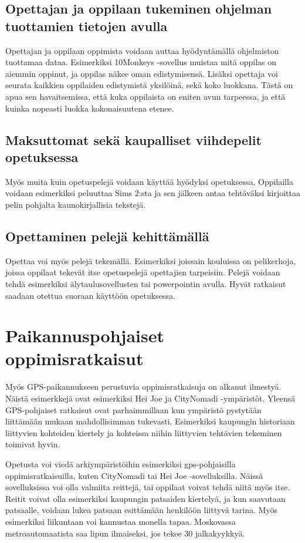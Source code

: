 \documentclass[utf8,bachelor]{gradu3}
\begin{document}
\subsection{Opettajan ja oppilaan tukeminen ohjelman tuottamien tietojen avulla}
Opettajan ja oppilaan oppimista voidaan auttaa hyödyntämällä ohjelmiston tuottamaa dataa. Esimerkiksi 10Monkeys -sovellus muistaa mitä oppilas on aiemmin oppinut, ja oppilas näkee oman edistymisensä. Lisäksi opettaja voi seurata kaikkien oppilaiden edistymistä yksilöinä, sekä koko luokkana. Tästä on apua sen havaitsemissa, että kuka oppilaista on eniten avun tarpeessa, ja että kuinka nopeasti luokka kokonaisuutena etenee.

\subsection{Maksuttomat sekä kaupalliset viihdepelit opetuksessa}
Myös muita kuin opetuspelejä voidaan käyttää hyödyksi opetuksessa. Oppilailla voidaan esimerkiksi peluuttaa Sims 2:sta ja sen jälkeen antaa tehtäväksi kirjoittaa pelin pohjalta kaunokirjallisia tekstejä. \parencite[][41-43]{laatua}

\subsection{Opettaminen pelejä kehittämällä}
Opettaa voi myös pelejä tekemällä. Esimerkiksi joissain kouluissa on pelikerhoja, joissa oppilaat tekevät itse opetuspelejä opettajien tarpeisiin. Pelejä voidaan tehdä esimerkiksi älytaulusovellusten tai powerpointin avulla. Hyvät ratkaisut saadaan otettua suoraan käyttöön opetuksessa. \parencite[][]{peleja}


\section{Paikannuspohjaiset oppimisratkaisut}
Myös GPS-paikannukseen perustuvia oppimisratkaisuja on alkanut ilmestyä. Näistä esimerkkejä ovat esimerkiksi Hei Joe ja CityNomadi -ympäristöt. Yleensä GPS-pohjaiset ratkaisut ovat parhaimmillaan kun ympäristö pystytään liittämään mukaan mahdollisimman tukevasti. Esimerkiksi kaupungin historiaan liittyvien kohteiden kiertely ja kohteissa niihin liittyvien tehtävien tekeminen toimivat hyvin.

Opetusta voi viedä arkiympäristöihin esimerkiksi gps-pohjaisilla oppimisratkaisuilla, kuten CityNomadi tai Hei Joe -sovelluksilla. Näissä sovelluksissa voi olla valmiita reittejä, tai oppilaat voivat tehdä niitä myös itse. Reitit voivat olla esimerkiksi kaupungin patsaiden kiertelyä, ja kun saavutaan patsaalle, voidaan lukea patsaan esittämään henkilöön liittyvä tarina. Myös esimerkiksi liikuntaan voi kannustaa monella tapaa. Moskovassa metroautomaatista saa lipun ilmaiseksi, jos tekee 30 jalkakyykkyä.
\end{document}

